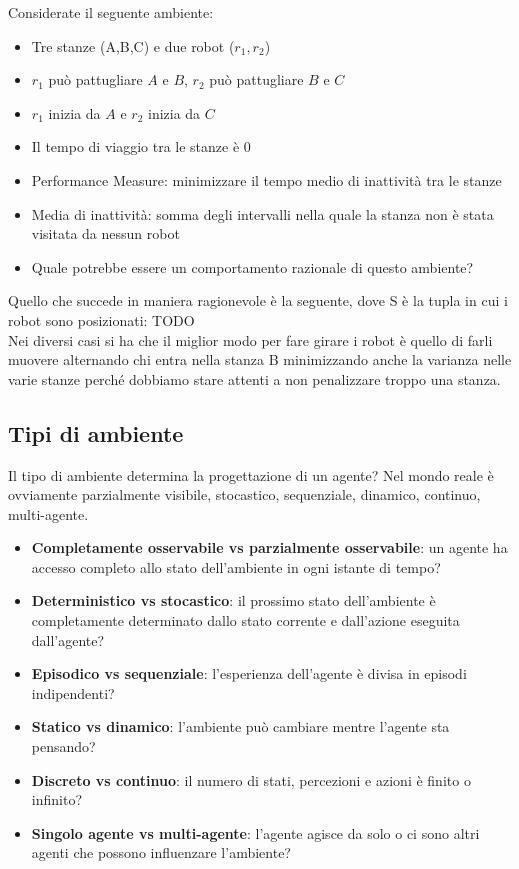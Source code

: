 \documentclass[a4paper]{article}
\begin{document}
\ex{}
{
    Considerate il seguente ambiente:
    \begin{itemize}
        \item Tre stanze (A,B,C) e due robot ($r_1, r_2$)
        \item $r_1$ può pattugliare $A$ e $B$, $r_2$ può pattugliare $B$ e $C$
        \item $r_1$ inizia da $A$ e $r_2$ inizia da $C$
        \item Il tempo di viaggio tra le stanze è $0$
        \item Performance Measure: minimizzare il tempo medio di inattività tra le stanze
        \item Media di inattività: somma degli intervalli nella quale la stanza non è stata visitata 
        da nessun robot
        \item Quale potrebbe essere un comportamento razionale di questo ambiente?
    \end{itemize}
    Quello che succede in maniera ragionevole è la seguente, dove S è la tupla
    in cui i robot sono posizionati:
    TODO
    \\
    Nei diversi casi si ha che il miglior modo per fare girare i robot
    è quello di farli muovere alternando chi entra nella stanza B 
    minimizzando anche la varianza nelle varie stanze perché dobbiamo
    stare attenti a non penalizzare troppo una stanza.
}

\subsection{Tipi di ambiente}

Il tipo di ambiente determina la progettazione di un agente? 
Nel mondo reale è ovviamente parzialmente visibile, stocastico, sequenziale,
dinamico, continuo, multi-agente.

\begin{itemize}
    \item \textbf{Completamente osservabile vs parzialmente osservabile}: un agente ha accesso
    completo allo stato dell'ambiente in ogni istante di tempo?
    \item \textbf{Deterministico vs stocastico}: il prossimo stato dell'ambiente è completamente
    determinato dallo stato corrente e dall'azione eseguita dall'agente?
    \item \textbf{Episodico vs sequenziale}: l'esperienza dell'agente è divisa in episodi
    indipendenti?
    \item \textbf{Statico vs dinamico}: l'ambiente può cambiare mentre l'agente sta pensando?
    \item \textbf{Discreto vs continuo}: il numero di stati, percezioni e azioni è finito o infinito?
    \item \textbf{Singolo agente vs multi-agente}: l'agente agisce da solo o ci sono altri agenti
    che possono influenzare l'ambiente?
\end{itemize}
\end{document}

